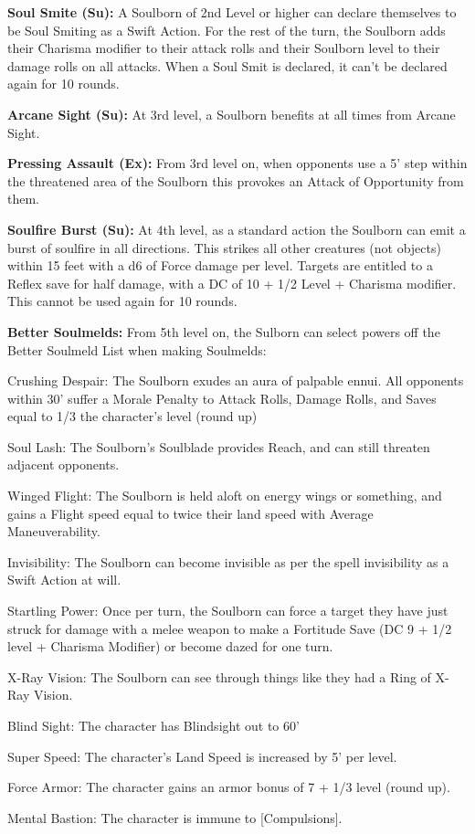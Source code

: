 \textbf{Soul Smite (Su):} A Soulborn of 2nd Level or higher can declare themselves to be Soul Smiting as a Swift Action. For the rest of the turn, the Soulborn adds their Charisma modifier to their attack rolls and their Soulborn level to their damage rolls on all attacks. When a Soul Smit is declared, it can't be declared again for 10 rounds.

\textbf{Arcane Sight (Su):} At 3rd level, a Soulborn benefits at all times from Arcane Sight. 

\textbf{Pressing Assault (Ex):} From 3rd level on, when opponents use a 5' step within the threatened area of the Soulborn this provokes an Attack of Opportunity from them. 

\textbf{Soulfire Burst (Su):} At 4th level, as a standard action the Soulborn can emit a burst of soulfire in all directions. This strikes all other creatures (not objects) within 15 feet with a d6 of Force damage per level. Targets are entitled to a Reflex save for half damage, with a DC of 10 + 1/2 Level + Charisma modifier. This cannot be used again for 10 rounds. 

\textbf{Better Soulmelds:} From 5th level on, the Sulborn can select powers off the Better Soulmeld List when making Soulmelds: 
\begin{itemize*}
\item Crushing Despair: The Soulborn exudes an aura of palpable ennui. All opponents within 30' suffer a Morale Penalty to Attack Rolls, Damage Rolls, and Saves equal to 1/3 the character's level (round up) 
\item Soul Lash: The Soulborn's Soulblade provides Reach, and can still threaten adjacent opponents. 
\item Winged Flight: The Soulborn is held aloft on energy wings or something, and gains a Flight speed equal to twice their land speed with Average Maneuverability. 
\item Invisibility: The Soulborn can become invisible as per the spell invisibility as a Swift Action at will. 
\item Startling Power: Once per turn, the Soulborn can force a target they have just struck for damage with a melee weapon to make a Fortitude Save (DC 9 + 1/2 level + Charisma Modifier) or become dazed for one turn. 
\item X-Ray Vision: The Soulborn can see through things like they had a Ring of X-Ray Vision. 
\item Blind Sight: The character has Blindsight out to 60' 
\item Super Speed: The character's Land Speed is increased by 5' per level. 
\item Force Armor: The character gains an armor bonus of 7 + 1/3 level (round up). 
\item Mental Bastion: The character is immune to [Compulsions].
\end{itemize*}

